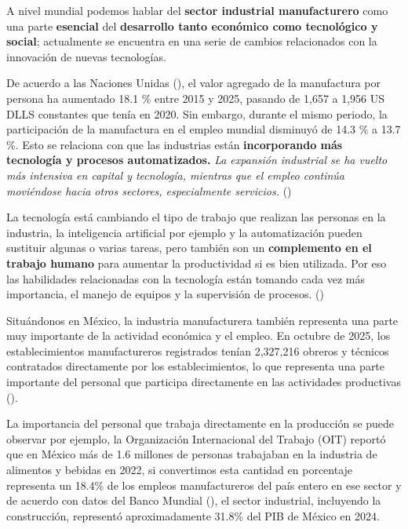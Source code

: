 A nivel mundial podemos hablar del \textbf{sector industrial manufacturero} como una parte \textbf{esencial} del \textbf{desarrollo tanto económico como tecnológico y social}; actualmente se encuentra en una serie de cambios relacionados con la innovación de nuevas tecnologías.

\vspace{0.5 em}

De acuerdo a las Naciones Unidas (\citeyear{un_goal9_2026}), el valor agregado de la manufactura por persona ha aumentado 18.1 \% entre 2015 y 2025, pasando de 1,657 a 1,956 US DLLS constantes que tenía en 2020. Sin embargo, durante el mismo periodo, la participación de la manufactura en el empleo mundial disminuyó de 14.3 \% a 13.7 \%. Esto se relaciona con que las industrias están \textbf{incorporando más tecnología y procesos automatizados.} \textit{La expansión industrial se ha vuelto más intensiva en capital y tecnología, mientras que el empleo continúa moviéndose hacia otros sectores, especialmente servicios.} (\cite{un_goal9_2026})

\vspace{0.5 em}

La tecnología está cambiando el tipo de trabajo que realizan las personas en la industria, la inteligencia artificial por ejemplo y la automatización pueden sustituir algunas o varias tareas, pero también son un \textbf{complemento en el trabajo humano} para aumentar la productividad si es bien utilizada. Por eso las habilidades relacionadas con la tecnología están tomando cada vez más importancia, el manejo de equipos y la supervisión de procesos. (\cite{oit_ia_manufactura_2026})

\vspace{0.5 em}

Situándonos en México, la industria manufacturera también representa una parte muy importante de la actividad económica y el empleo. En octubre de 2025, los establecimientos manufactureros registrados tenían 2,327,216 obreros y técnicos contratados directamente por los establecimientos, lo que representa una parte importante del personal que participa directamente en las actividades productivas (\cite{inegi_immex_2025}). 

\vspace{0.5 em}

La importancia del personal que trabaja directamente en la producción se puede observar por ejemplo, la Organización Internacional del Trabajo (OIT) reportó que en México más de 1.6 millones de personas trabajaban en la industria de alimentos y bebidas en 2022, si convertimos esta cantidad en porcentaje representa un 18.4\% de los empleos manufactureros del país entero en ese sector y de acuerdo con datos del Banco Mundial (\citeyear{banco_mundial_industria_mexico_2025}), el sector industrial, incluyendo la construcción, representó aproximadamente 31.8\% del PIB de México en 2024. 


